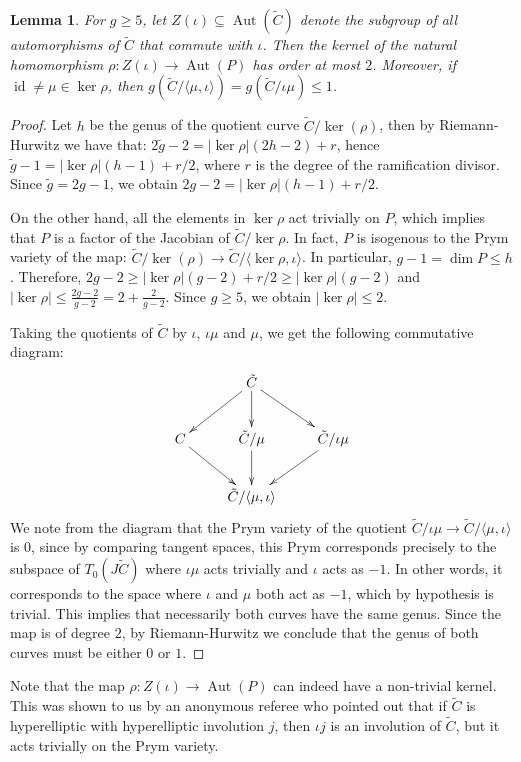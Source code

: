 \documentclass[preprint,12pt]{amsart}
\def\tC{\ensuremath{\tilde{C}}}
\DeclareMathOperator{\id}{id}
\theoremstyle{plain}
\newtheorem{lemma}[lemma]{Lemma}
\theoremstyle{definition}
\begin{document}
\begin{lemma}\label{lem:ord2kernel}
For $g\geq 5$, let $Z(\iota)\subseteq\operatorname{Aut}(\tilde{C})$ denote the subgroup of all automorphisms of $\tilde{C}$ that commute with $\iota$. Then the kernel of the natural homomorphism $\rho:Z(\iota)\to\operatorname{Aut}(P)$ has order at most $2$.
Moreover, if $\id\neq \mu \in \ker \rho$, then $g(\tilde C /\langle\mu,\iota\rangle)=g(\tilde C/\iota \mu)\le 1$.
\end{lemma}
\begin{proof}
Let $h$ be the genus of the quotient curve  $\tilde{C}/\ker(\rho )$, then by Riemann-Hurwitz we have that: $2\tilde{g}-2=\left|\ker\rho\right|(2h-2)+r$, hence $\tilde{g}-1=\left|\ker\rho\right|(h-1)+r/2$, where $r$ is the degree of the ramification divisor.
Since $\tilde{g}=2g-1$, we obtain  $2g-2=\left|\ker\rho\right|(h-1)+r/2$.
 
On the other hand, all the elements in  $\ker\rho$ act trivially on $P$,  which implies that $P$ is a factor of the Jacobian of $\tilde{C}/\ker\rho$.
In fact, $P$ is isogenous to the  Prym  variety of the map: $\tilde{C}/\ker(\rho)\to\tilde{C}/\langle\ker\rho,\iota\rangle$.
In particular, $g-1=\dim P\le h$.
Therefore, $2g-2 \ge \left|\ker\rho\right|(g-2)+r/2\geq \left|\ker\rho\right|(g-2)$ and $\left|\ker\rho\right|\le \frac {2g-2}{g-2}=2+\frac{2}{g-2}$.
Since  $g\geq 5$, we obtain $\left|\ker\rho\right|\leq 2$.  

Taking the quotients of $\tC$ by $\iota$, $\iota\mu$ and $\mu$, we get the following commutative diagram:
\begin{equation}\label{diagram0}
 \xymatrix{
&\tC\ar[dl] \ar[d] \ar[dr] &\\
C\ar[dr] & \tC /\mu \ar[d] &\tC / \iota \mu\ar[dl] \\
& \tC /\langle \mu, \iota \rangle&}
\end{equation}
We note from the diagram that the Prym variety of the quotient $\tilde{C}/\iota\mu \to\tilde{C}/\langle\mu,\iota \rangle$ is $0$, since by comparing tangent spaces, this Prym corresponds precisely to the subspace of $T_0(J\tC)$ where $\iota\mu$ acts trivially and $\iota$ acts as $-1$. In other words, it corresponds to the space where $\iota$ and $\mu$ both act as $-1$, which by hypothesis is trivial. This implies that necessarily both curves have the same genus. Since the map is of degree $2$, by Riemann-Hurwitz we conclude that the genus of both curves must be either $0$ or $1$. 
\end{proof}
Note that the map $\rho:Z(\iota)\to \operatorname{Aut}(P)$ can indeed have a non-trivial kernel.
This was shown to us by an anonymous referee who pointed out that if $\tilde{C}$ is hyperelliptic with hyperelliptic involution $j$, then $\iota j$ is an involution of $\tC$, but it acts trivially on the Prym variety.
\end{document}
